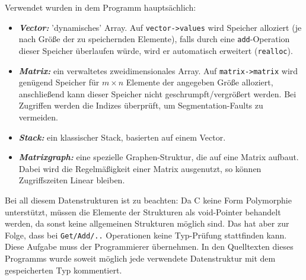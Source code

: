 Verwendet wurden in dem Programm hauptsächlich:

\begin{itemize}
	\item \textsl{\textbf{Vector:}} 'dynamisches' Array. Auf \verb+vector->values+ wird Speicher alloziert (je nach Größe der zu speichernden Elemente), falls durch eine \verb+add+-Operation dieser Speicher überlaufen würde, wird er automatisch erweitert (\verb+realloc+).
	\item \textsl{\textbf{Matrix:}} ein verwaltetes zweidimensionales Array. Auf \verb+matrix->matrix+ wird genügend Speicher für $m \times n$ Elemente der angegeben Größe alloziert, anschließend kann dieser Speicher nicht geschrumpft/vergrößert werden. Bei Zugriffen werden die Indizes überprüft, um Segmentation-Faults zu vermeiden.
	\item \textsl{\textbf{Stack:}} ein klassischer Stack, basierten auf einem Vector.
	\item \textsl{\textbf{Matrixgraph:}} eine spezielle Graphen-Struktur, die auf eine Matrix aufbaut. Dabei wird die Regelmäßigkeit einer Matrix ausgenutzt, so können Zugriffszeiten Linear bleiben.
\end{itemize}

Bei all diesem Datenstrukturen ist zu beachten: Da C keine Form Polymorphie unterstützt, müssen die Elemente der Strukturen als void-Pointer behandelt werden, da sonst keine allgemeinen Strukturen möglich sind. Das hat aber zur Folge, dass bei \verb+Get/Add/..+ Operationen keine Typ-Prüfung stattfinden kann. Diese Aufgabe muss der Programmierer übernehmen. In den Quelltexten dieses Programms wurde soweit möglich jede verwendete Datenstruktur mit dem gespeicherten Typ kommentiert.